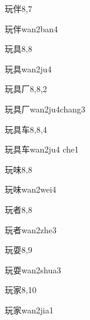 \begin{entry}{玩伴}{8,7}
  \begin{phonetics}{玩伴}{wan2ban4}
  \end{phonetics}
\end{entry}

\begin{entry}{玩具}{8,8}
  \begin{phonetics}{玩具}{wan2ju4}
  \end{phonetics}
\end{entry}

\begin{entry}{玩具厂}{8,8,2}
  \begin{phonetics}{玩具厂}{wan2ju4chang3}
  \end{phonetics}
\end{entry}

\begin{entry}{玩具车}{8,8,4}
  \begin{phonetics}{玩具车}{wan2ju4 che1}
  \end{phonetics}
\end{entry}

\begin{entry}{玩味}{8,8}
  \begin{phonetics}{玩味}{wan2wei4}
  \end{phonetics}
\end{entry}

\begin{entry}{玩者}{8,8}
  \begin{phonetics}{玩者}{wan2zhe3}
  \end{phonetics}
\end{entry}

\begin{entry}{玩耍}{8,9}
  \begin{phonetics}{玩耍}{wan2shua3}
  \end{phonetics}
\end{entry}

\begin{entry}{玩家}{8,10}
  \begin{phonetics}{玩家}{wan2jia1}
  \end{phonetics}
\end{entry}

